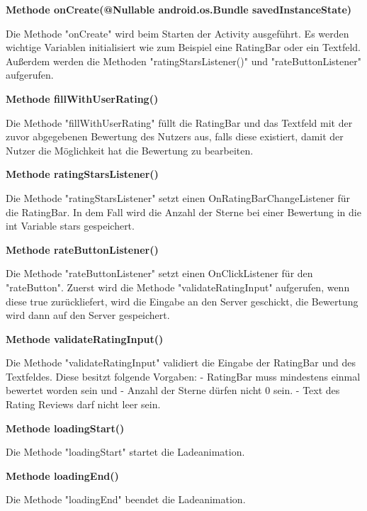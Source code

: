 \documentclass{scrartcl}
\begin{document}
\noindent\textbf{Methode onCreate(@Nullable android.os.Bundle savedInstanceState)}

\noindent Die Methode "onCreate" wird beim Starten der Activity ausgeführt. Es werden wichtige Variablen initialisiert wie zum Beispiel eine RatingBar oder ein Textfeld. Außerdem werden die Methoden "ratingStarsListener()" und "rateButtonListener" aufgerufen. \newline

\noindent\textbf{Methode fillWithUserRating()}

\noindent Die Methode "fillWithUserRating" füllt die RatingBar und das Textfeld mit der zuvor abgegebenen Bewertung des Nutzers aus, falls diese existiert, damit der Nutzer die Möglichkeit hat die Bewertung zu bearbeiten. \newline 

\noindent\textbf{Methode ratingStarsListener()}

\noindent Die Methode "ratingStarsListener" setzt einen OnRatingBarChangeListener für die RatingBar. In dem Fall wird die Anzahl der Sterne bei einer Bewertung in die int Variable stars gespeichert. \newline 

\noindent\textbf{Methode rateButtonListener()}

\noindent Die Methode "rateButtonListener" setzt einen OnClickListener für den "rateButton". Zuerst wird die Methode "validateRatingInput" aufgerufen, wenn diese true zurückliefert, wird die Eingabe an den Server geschickt, die Bewertung wird dann auf den Server gespeichert. \newline 

\noindent\textbf{Methode validateRatingInput()}

\noindent Die Methode "validateRatingInput" validiert die Eingabe der RatingBar und des Textfeldes. Diese besitzt folgende Vorgaben: - RatingBar muss mindestens einmal bewertet worden sein und - Anzahl der Sterne dürfen nicht 0 sein. - Text des Rating Reviews darf nicht leer sein. \newline 

\noindent\textbf{Methode loadingStart()}

\noindent Die Methode "loadingStart" startet die Ladeanimation. \newline

\noindent\textbf{Methode loadingEnd()}

\noindent Die Methode "loadingEnd" beendet die Ladeanimation. \newline
\end{document}
